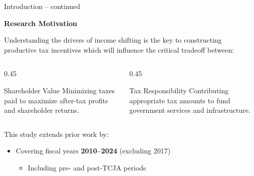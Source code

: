 \documentclass{beamer}
\begin{document}
\begin{frame}{Introduction -- continued}
\centerline{\large\textbf{Research Motivation}}
\vspace{0.2cm}
Understanding the drivers of income shifting is the key to constructing productive tax incentives which will influence the critical tradeoff between:

\vspace{0.3cm}
\begin{columns}[T]
\begin{column}{0.45\textwidth}
\begin{block}{Shareholder Value}
Minimizing taxes paid to maximize after-tax profits and shareholder returns.
\end{block}
\end{column}
\begin{column}{0.45\textwidth}
\begin{block}{Tax Responsibility}
Contributing appropriate tax amounts to fund government services and infrastructure.
\end{block}
\end{column}
\end{columns}

\vspace{0.4cm}
This study extends prior work by:
\begin{itemize}
    \item Covering fiscal years \textbf{2010--2024} (excluding 2017)
    \begin{itemize}
        \item Including pre- and post-TCJA periods
    \end{itemize}
\end{itemize}
\end{frame}
\end{document}
